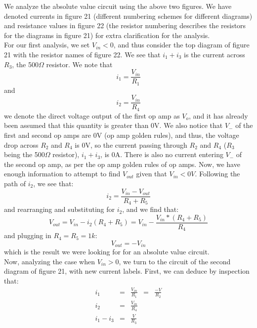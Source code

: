 \documentclass{article}
\begin{document}
    We analyze the absolute value circuit using the above two figures. We have denoted currents in figure 21 (different numbering schemes for different diagrams) and resistance values in figure 22 (the resistor numbering describes the resistors for the diagrams in figure 21) for extra clarification for the analysis. \\\indent For our first analysis, we set $V_{in} < 0$, and thus consider the top diagram of figure 21 with the resistor names of figure 22. We see that $i_1 + i_3$ is the current across $R_3$, the 500$\Omega$ resistor. We note that 
    \begin{equation}
        i_1 = \frac{V_{in}}{R_1}
    \end{equation}
    and 
    \begin{equation}
        i_2 = \frac{V_{in}}{R_4}
    \end{equation}
    we denote the direct voltage output of the first op amp as $V_o$, and it has already been assumed that this quantity is greater than 0V. We also notice that $V_-$ of the first and second op amps are 0V (op amp golden rules), and thus, the voltage drop across $R_2$ and $R_4$ is 0V, so the current passing through $R_2$ and $R_4$ ($R_3$ being the 500$\Omega$ resistor), $i_1 + i_3$, is 0A. There is also no current entering $V_-$ of the second op amp, as per the op amp golden rules of op amps. Now, we have enough information to attempt to find $V_{out}$ given that $V_{in} < 0V$. Following the path of $i_2$, we see that:
    \begin{equation}
        i_2 = \frac{V_{in} - V_{out}}{R_4 + R_5}
    \end{equation}
    and rearranging and substituting for $i_2$, and we find that:
    \begin{equation}
        V_{out} = V_{in} - i_2 (R_4 + R_5) = V_{in} - \frac{V_{in}*(R_4 + R_5)}{R_4}
    \end{equation}
    and plugging in $R_4 = R_5 = 1k$:
    \begin{equation}
        V_{out} = -V_{in}
    \end{equation}
    which is the result we were looking for for an absolute value circuit.
    \\\indent Now, analyzing the case when $V_{in} > 0$, we turn to the circuit of the second diagram of figure 21, with new current labels. First, we can deduce by inspection that:
    \begin{equation}
        \begin{array}{lllll}
            i_1 & = & \frac{V_{in}}{R_1} & = & \frac{-V}{R_2}\\
            i_2 & = & \frac{V_{in}}{R_4} &  &  \\
            i_1 - i_3 & = & \frac{V}{R_3} &  &  
        \end{array}
    \end{equation}
\end{document}
